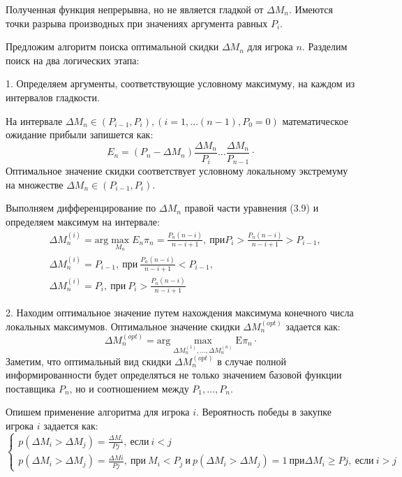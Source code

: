 Полученная функция непрерывна, но не является гладкой от $\Delta M_n$. Имеются точки разрыва производных при значениях аргумента равных $P_i$.

Предложим алгоритм поиска оптимальной скидки $\Delta M_n$ для игрока $n$. Разделим поиск на два логических этапа:

1. Определяем аргументы, соответствующие условному максимуму, на каждом из интервалов гладкости. 

На интервале $\Delta M_n \in ( P_{i-1},P_i), (i = 1, … (n-1), P_0=0)$ математическое ожидание прибыли запишется как:
\begin{equation}
	E_n =(P_n-\Delta M_n)\frac{\Delta M_n}{P_i} \dots \frac{\Delta M_n}{P_{n-1}}\cdot
\end{equation}	
Оптимальное значение скидки соответствует условному локальному экстремуму на множестве $\Delta M_n \in (P_{i-1},P_i)$. 

Выполняем дифференцирование по $\Delta M_n$ правой части уравнения (3.9) и определяем максимум на интервале:
\begin{equation}
	\begin{aligned}
		& \Delta M_n^{(i)} =\text{arg} \max_{M_n} E_n \pi_n = \frac{P_{n}(n-i)}{n-i+1},\ \text{при} P_i> \frac{P_n(n-i)}{n-i+1}> P_{i-1}, \\ 
		& \Delta M_n^{(i)}=P_{i-1},\  \text{при} \ \frac{P_{n}(n-i)}{n-i+1} < P_{i-1}, \\
		& \Delta M_n^{(i)}=P_i , \ \text{при} \ P_i> \frac{P_n(n-i)}{n-i+1}
	\end{aligned}
\end{equation}

2. Находим оптимальное значение  путем нахождения максимума конечного числа локальных максимумов. Оптимальное значение скидки $\Delta M_n^{(opt)}$ задается как:
\begin{equation}
	\Delta M_n^{(opt)}= \text{arg} \max_{\Delta M_n^{(1)},\dots,\Delta M_n^{(n)}}\mathrm{E} \pi_{n} \cdot
\end{equation}
Заметим, что оптимальный вид скидки $\Delta M_n^{(opt)}$ в случае полной информированности будет определяться не только значением базовой функции поставщика $P_n$, но и соотношением между $P_1,\dots,P_n$.

Опишем применение алгоритма для игрока $i$. Вероятность победы в закупке игрока $i$ задается как:
\begin{equation}
	\begin{cases}
		p(\Delta M_i > \Delta M_j)= \frac{\Delta M_i}{Pj}, \ если \ i<j \\ 
		p(\Delta M_i >\Delta M_j)= \frac{\Delta Mi}{Pj}, \ при \ M_i<P_j \ и \ p(\Delta M_i > \Delta M_j)=1 \ при \Delta M_i \ge Pj, \  если \ i >j
	\end{cases}
\end{equation}
 
